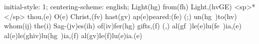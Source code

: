 initial-style: 1;
centering-scheme: english;
Light(hg) from(fh) Light,(hvGE) <sp>*</sp> thou,(e) O(e) Christ,(fv) hast(gv) ap(e)peared:(fe) (;) un(hg~)to(hv) whom(ij) the(i) Sag-(jv)es(ih) of(iv)fer(hg) gifts,(f) (,) al(gf~)le(e)lu(fe~)ia,(e) al(e)le(ghiv)lu(hg~)ia,(f) al(gv)le(f)lu(e)ia.(e)